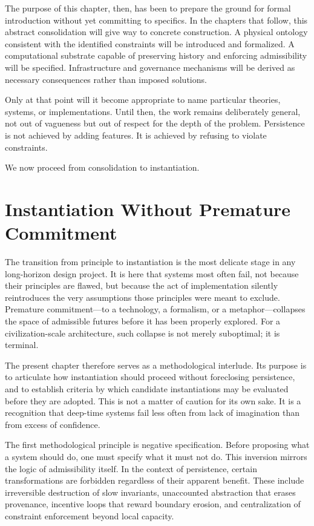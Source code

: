 \documentclass[12pt,oneside]{book}
\begin{document}
The purpose of this chapter, then, has been to prepare the ground for formal introduction without yet committing to specifics. In the chapters that follow, this abstract consolidation will give way to concrete construction. A physical ontology consistent with the identified constraints will be introduced and formalized. A computational substrate capable of preserving history and enforcing admissibility will be specified. Infrastructure and governance mechanisms will be derived as necessary consequences rather than imposed solutions.

Only at that point will it become appropriate to name particular theories, systems, or implementations. Until then, the work remains deliberately general, not out of vagueness but out of respect for the depth of the problem. Persistence is not achieved by adding features. It is achieved by refusing to violate constraints.

We now proceed from consolidation to instantiation.

\chapter{Instantiation Without Premature Commitment}

The transition from principle to instantiation is the most delicate stage in any long-horizon design project. It is here that systems most often fail, not because their principles are flawed, but because the act of implementation silently reintroduces the very assumptions those principles were meant to exclude. Premature commitment—to a technology, a formalism, or a metaphor—collapses the space of admissible futures before it has been properly explored. For a civilization-scale architecture, such collapse is not merely suboptimal; it is terminal.

The present chapter therefore serves as a methodological interlude. Its purpose is to articulate how instantiation should proceed without foreclosing persistence, and to establish criteria by which candidate instantiations may be evaluated before they are adopted. This is not a matter of caution for its own sake. It is a recognition that deep-time systems fail less often from lack of imagination than from excess of confidence.

The first methodological principle is negative specification. Before proposing what a system should do, one must specify what it must not do. This inversion mirrors the logic of admissibility itself. In the context of persistence, certain transformations are forbidden regardless of their apparent benefit. These include irreversible destruction of slow invariants, unaccounted abstraction that erases provenance, incentive loops that reward boundary erosion, and centralization of constraint enforcement beyond local capacity.
\end{document}
